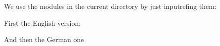 \documentclass[mh]{smglom}
\begin{document}
We use the modules in the current directory by just inputrefing them:

First the English version:


And then the German one

\end{document}
